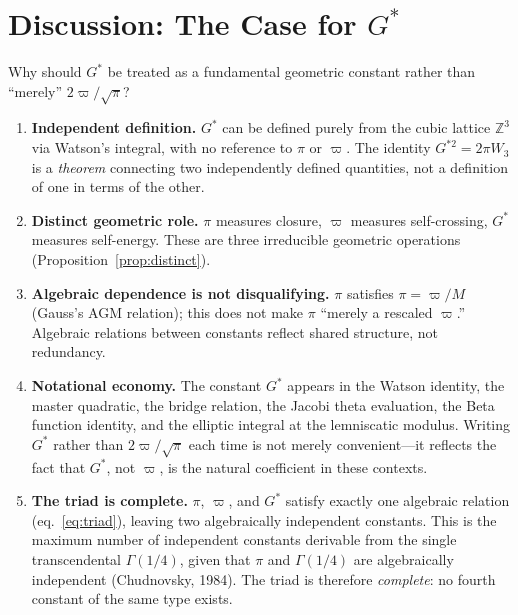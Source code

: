 \documentclass[12pt]{article}
\theoremstyle{definition}
\theoremstyle{remark}
\begin{document}
\section{Discussion: The Case for $G^*$}
\label{sec:case}

Why should $G^*$ be treated as a fundamental geometric constant rather than ``merely'' $2\varpi/\sqrt{\pi}$?

\begin{enumerate}
    \item \textbf{Independent definition.} $G^*$ can be defined purely from the cubic lattice $\mathbb{Z}^3$ via Watson's integral, with no reference to $\pi$ or $\varpi$. The identity $G^{*2} = 2\pi W_3$ is a \emph{theorem} connecting two independently defined quantities, not a definition of one in terms of the other.

    \item \textbf{Distinct geometric role.} $\pi$ measures closure, $\varpi$ measures self-crossing, $G^*$ measures self-energy. These are three irreducible geometric operations (Proposition~\ref{prop:distinct}).

    \item \textbf{Algebraic dependence is not disqualifying.} $\pi$ satisfies $\pi = \varpi/M$ (Gauss's AGM relation); this does not make $\pi$ ``merely a rescaled $\varpi$.'' Algebraic relations between constants reflect shared structure, not redundancy.

    \item \textbf{Notational economy.} The constant $G^*$ appears in the Watson identity, the master quadratic, the bridge relation, the Jacobi theta evaluation, the Beta function identity, and the elliptic integral at the lemniscatic modulus. Writing $G^*$ rather than $2\varpi/\sqrt{\pi}$ each time is not merely convenient---it reflects the fact that $G^*$, not $\varpi$, is the natural coefficient in these contexts.

    \item \textbf{The triad is complete.} $\pi$, $\varpi$, and $G^*$ satisfy exactly one algebraic relation (eq.~\ref{eq:triad}), leaving two algebraically independent constants. This is the maximum number of independent constants derivable from the single transcendental $\Gamma(1/4)$, given that $\pi$ and $\Gamma(1/4)$ are algebraically independent (Chudnovsky, 1984). The triad is therefore \emph{complete}: no fourth constant of the same type exists.
\end{enumerate}
\end{document}
